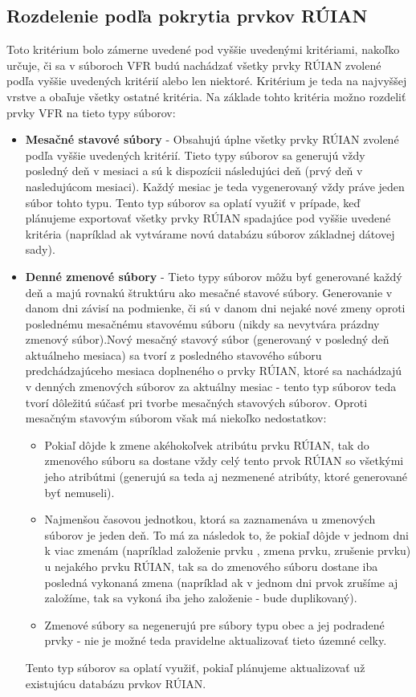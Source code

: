 \subsection{Rozdelenie podľa pokrytia prvkov RÚIAN}
Toto kritérium bolo zámerne uvedené pod vyššie uvedenými kritériami, nakoľko určuje, či sa v súboroch VFR budú nachádzať všetky prvky RÚIAN zvolené podľa vyššie uvedených kritérií alebo len niektoré. Kritérium je teda na najvyššej vrstve a obaľuje všetky ostatné kritéria. Na základe tohto kritéria možno rozdeliť prvky VFR na tieto typy súborov:
\begin{itemize}
    \item {{\bf Mesačné stavové súbory} - Obsahujú úplne všetky prvky RÚIAN zvolené podľa vyššie uvedených kritérií. Tieto typy súborov sa generujú vždy posledný deň v mesiaci a sú k dispozícii následujúci deň (prvý deň v nasledujúcom mesiaci). Každý mesiac je teda vygenerovaný vždy práve jeden súbor tohto typu. Tento typ súborov sa oplatí využiť v prípade, keď plánujeme exportovať všetky prvky RÚIAN spadajúce pod vyššie uvedené kritéria (napríklad ak vytvárame novú databázu súborov základnej dátovej sady).}
    \item{{\bf Denné zmenové súbory} - Tieto typy súborov môžu byť generované každý deň a majú rovnakú štruktúru ako mesačné stavové súbory. Generovanie v danom dni závisí na podmienke, či sú v danom dni nejaké nové zmeny oproti poslednému mesačnému stavovému súboru (nikdy sa nevytvára prázdny zmenový súbor).Nový mesačný stavový súbor (generovaný v posledný deň aktuálneho mesiaca) sa tvorí z posledného stavového súboru predchádzajúceho mesiaca doplneného o prvky RÚIAN, ktoré sa nachádzajú v denných zmenových súborov za aktuálny mesiac - tento typ súborov teda tvorí dôležitú súčasť pri tvorbe mesačných stavových súborov. Oproti mesačným stavovým súborom však má niekoľko nedostatkov: 
    \begin{itemize}
    \item{Pokiaľ dôjde k zmene akéhokoľvek atribútu prvku RÚIAN, tak do zmenového súboru sa dostane vždy celý tento prvok RÚIAN so všetkými jeho atribútmi (generujú sa teda aj nezmenené atribúty, ktoré generované byť nemuseli).}
    \item{Najmenšou časovou jednotkou, ktorá sa zaznamenáva u zmenových súborov je jeden deň. To má za
    následok to, že pokiaľ dôjde v jednom dni k viac zmenám (napríklad založenie prvku , zmena prvku, zrušenie prvku) u nejakého prvku RÚIAN, tak sa do zmenového súboru dostane iba posledná vykonaná zmena (napríklad ak v jednom dni prvok zrušíme aj založíme, tak sa vykoná iba jeho založenie - bude duplikovaný).}
    \item{Zmenové súbory sa negenerujú pre súbory typu obec a jej podradené prvky - nie je možné teda pravidelne aktualizovať tieto územné celky.}
    \end{itemize}
    }
    Tento typ súborov sa oplatí využiť, pokiaľ plánujeme aktualizovať už existujúcu databázu prvkov RÚIAN.
\end{itemize}

